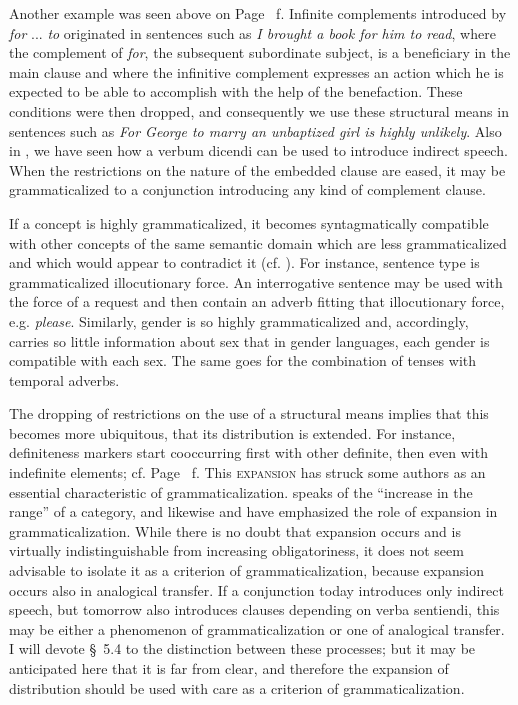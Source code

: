 Another example was seen above on Page~\pageref{page72}\chk%
f. Infinite complements introduced by \textit{for} ... \textit{to} originated in sentences such as \textit{I brought a book for him to read}, where the complement of \textit{for}, the subsequent subordinate subject, is a beneficiary in the main clause and where the infinitive complement expresses an action which he is expected to be able to accomplish with the help of the benefaction. These conditions were then dropped, and consequently we use these structural means in sentences such as \textit{For George to marry an unbaptized girl is highly unlikely}. Also in , we have seen how a verbum dicendi can be used to introduce indirect speech. When the restrictions on the nature of the embedded clause are eased, it may be grammaticalized to a conjunction introducing any kind of complement clause.

If a concept is highly grammaticalized, it becomes syntagmatically compatible with other concepts of the same semantic domain which are less grammaticalized and which would appear to contradict it (cf. \citealt[Ch. 15]{Paul1920}). For instance, sentence type is grammaticalized illocutionary force. An interrogative sentence may be used with the force of a request and then contain an adverb fitting that illocutionary force, e.g. \textit{please}. Similarly, gender is so highly grammaticalized and, accordingly, carries so little information about sex that in gender languages, each gender is compatible with each sex. The same goes for the combination of tenses with temporal adverbs.

The dropping of restrictions on the use of a structural means implies that this becomes more ubiquitous, that its distribution is extended. For instance, definiteness markers start cooccurring first with other definite, then even with indefinite elements; cf. Page~\pageref{page42}\chk%
f. This \textsc{expansion} has struck some authors as an essential characteristic of grammaticalization. \citet[41]{Kuryłowicz1965} speaks of the “increase in the range” of a category, and likewise \citet[184--188]{Lord1976} and \citet[39--41]{HeineEtAl1984} have emphasized the role of expansion in grammaticalization. While there is no doubt that expansion occurs and is virtually indistinguishable from increasing obligatoriness, it does not seem advisable to isolate it as a criterion of grammaticalization, because expansion occurs also in analogical transfer. If a conjunction today introduces only indirect speech, but tomorrow also introduces clauses depending on verba sentiendi, this may be either a phenomenon of grammaticalization or one of analogical transfer. I will devote §~5.4 to the distinction between these processes; but it may be anticipated here that it is far from clear, and therefore the expansion of distribution should be used with care as a criterion of grammaticalization.


